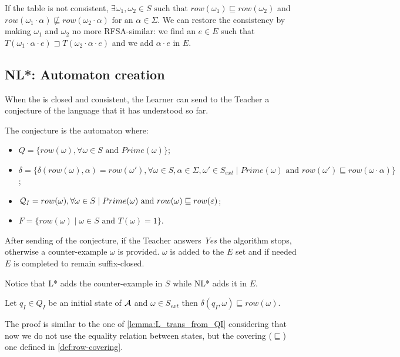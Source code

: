 If the table is not consistent, $\exists \omega_1, \omega_2 \in S \text{ such that } row(\omega_1) \sqsubseteq row(\omega_2)$ and $row(\omega_1 \cdot \alpha) \not\sqsubseteq row(\omega_2 \cdot \alpha) \text{ for an } \alpha \in \Sigma$. We can restore the consistency by making $\omega_1$ and $\omega_2$ no more RFSA-similar: we find an $e \in E$ such that $T(\omega_1 \cdot \alpha \cdot e) \sqsupset T(\omega_2 \cdot \alpha \cdot e)$ and we add $\alpha \cdot e$ in $E$.

\subsection{NL*: Automaton creation}

When the \OT is closed and consistent, the Learner can send to the Teacher a conjecture of the language that it has understood so far.

The conjecture is the automaton where:
\begin{itemize}
  \item $Q = \{row(\omega), \forall \omega \in S \text{ and } Prime(\omega) \}$;
  \item $\delta = \{ \delta(row(\omega), \alpha) = row(\omega'), \forall \omega \in S, \alpha \in \Sigma, \omega' \in S_{ext} \mid Prime(\omega) \text{ and } row(\omega') \sqsubseteq row(\omega \cdot \alpha)\}$;
  \item $\mathcal{Q}_I = row(\omega), \forall \omega \in S \mid Prime(\omega) \text{ and } row(\omega) \sqsubseteq row(\varepsilon) $;
  \item $F = \{row(\omega) \mid \omega \in S \text{ and } T(\omega) = 1 \}$.
\end{itemize}

After sending of the conjecture, if the Teacher answers \textit{Yes} the algorithm stops, otherwise a counter-example $\omega$ is provided. $\omega$ is added to the $E$ set and if needed $E$ is completed to remain suffix-closed.

\begin{remark}
  Notice that L* adds the counter-example in $S$ while NL* adds it in $E$.
\end{remark}

\begin{lemma}
  Let $q_I \in Q_I$ be an initial state of $\mathcal{A}$ and $\omega \in S_{ext}$ then $\delta(q_I, \omega) \sqsubseteq row(\omega)$.
\end{lemma}

The proof is similar to the one of \cref{lemma:L_trans_from_QI} considering that now we do not use the equality relation between states, but the covering ($\sqsubseteq$) one defined in \cref{def:row-covering}.

